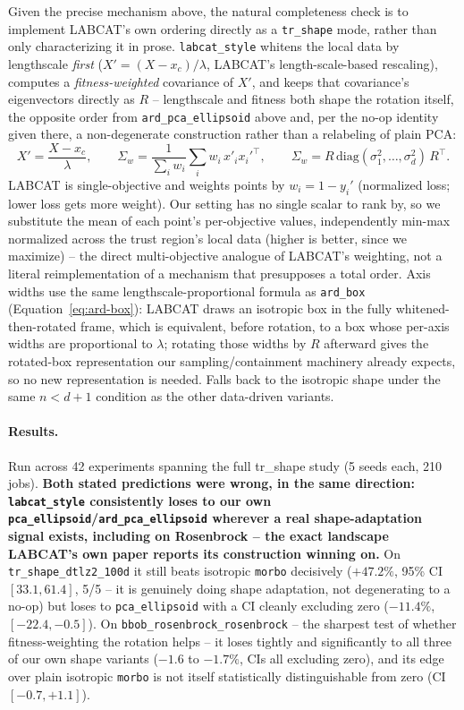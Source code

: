 \documentclass[11pt]{article}
\begin{document}
Given the precise mechanism above, the natural completeness check is to
implement LABCAT's own ordering directly as a \texttt{tr\_shape} mode,
rather than only characterizing it in prose. \texttt{labcat\_style}
whitens the local data by lengthscale \emph{first}
($X' = (X - x_c)/\lambda$, LABCAT's length-scale-based rescaling), computes
a \emph{fitness-weighted} covariance of $X'$, and keeps that covariance's
eigenvectors directly as $R$ -- lengthscale and fitness both shape the
rotation itself, the opposite order from \texttt{ard\_pca\_ellipsoid}
above and, per the no-op identity given there, a non-degenerate
construction rather than a relabeling of plain PCA:
\begin{equation}
  X' = \frac{X - x_c}{\lambda}, \qquad
  \Sigma_w = \frac{1}{\sum_i w_i}\sum_i w_i\, x'_i x_i'^\top, \qquad
  \Sigma_w = R\,\mathrm{diag}(\sigma_1^2,\dots,\sigma_d^2)\,R^\top.
\end{equation}
LABCAT is single-objective and weights points by $w_i = 1 - y_i'$
(normalized loss; lower loss gets more weight). Our setting has no single
scalar to rank by, so we substitute the mean of each point's per-objective
values, independently min-max normalized across the trust region's local
data (higher is better, since we maximize) -- the direct multi-objective
analogue of LABCAT's weighting, not a literal reimplementation of a
mechanism that presupposes a total order. Axis widths use the same
lengthscale-proportional formula as \texttt{ard\_box}
(Equation~\ref{eq:ard-box}): LABCAT draws an isotropic box in the fully
whitened-then-rotated frame, which is equivalent, before rotation, to a
box whose per-axis widths are proportional to $\lambda$; rotating those
widths by $R$ afterward gives the rotated-box representation our
sampling/containment machinery already expects, so no new representation
is needed. Falls back to the isotropic shape under the same $n < d+1$
condition as the other data-driven variants.

\paragraph{Results.} Run across 42 experiments spanning the full
tr\_shape study (5 seeds each, 210 jobs). \textbf{Both stated predictions
were wrong, in the same direction: \texttt{labcat\_style} consistently
loses to our own \texttt{pca\_ellipsoid}/\texttt{ard\_pca\_ellipsoid}
wherever a real shape-adaptation signal exists, including on Rosenbrock --
the exact landscape LABCAT's own paper reports its construction winning
on.} On \texttt{tr\_shape\_dtlz2\_100d} it still beats isotropic
\texttt{morbo} decisively ($+47.2\%$, 95\% CI $[33.1,61.4]$, 5/5 -- it is
genuinely doing shape adaptation, not degenerating to a no-op) but loses
to \texttt{pca\_ellipsoid} with a CI cleanly excluding zero ($-11.4\%$,
$[-22.4,-0.5]$). On \texttt{bbob\_rosenbrock\_rosenbrock} -- the sharpest
test of whether fitness-weighting the rotation helps -- it loses tightly
and significantly to all three of our own shape variants ($-1.6$ to
$-1.7\%$, CIs all excluding zero), and its edge over plain isotropic
\texttt{morbo} is not itself statistically distinguishable from zero (CI
$[-0.7,+1.1]$).
\end{document}
